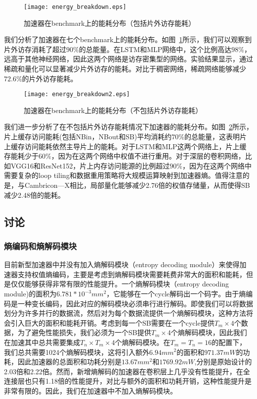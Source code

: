 \begin{figure}[h]
\centering
\texttt{[image: energy\_breakdown.eps]}
\caption{加速器在benchmark上的能耗分布（包括片外访存能耗）}
\label{fig:energy_breakdown}
\end{figure}

我们分析了加速器在七个benchmark上的能耗分布。如图~\ref{fig:energy_breakdown}所示，我们可以观察到片外访存消耗了超过$90\%$的总能量。在LSTM和MLP网络中，这个比例高达$98\%$，远高于其他神经网络，因此这两个网络是访存密集型的网络。实验结果显示，通过稀疏和量化可以显著减少片外访存的能耗。对比于稠密网络，稀疏网络能够减少$72.6\%$的片外访存能耗。

\begin{figure}[h]
\centering
\texttt{[image: energy\_breakdown2.eps]}
\caption{加速器在benchmark上的能耗分布（不包括片外访存能耗）}
\label{fig:energy_breakdown2}
\end{figure}

我们进一步分析了在不包括片外访存能耗情况下加速器的能耗分布。如图~\ref{fig:energy_breakdown2}所示，片上缓存访问能耗(包括NBin，NBout和SB)平均消耗约$70\%$的总能量，这表明片上缓存访问能耗依然主导片上的能耗。对于LSTM和MLP这两个网络上，片上缓存能耗少于$60\%$，因为在这两个网络中权值不进行重用。对于深层的卷积网络，比如VGG16和ResNet152，片上内存访问能源的比例超过$90\%$，因为在这两个网络中需要复杂的loop tiling和数据重用策略将大规模运算映射到加速器熵。值得注意的是，与Cambricon—X相比，局部量化能够减少2.76倍的权值存储量，从而使得SB减少2.48倍的能耗。

\subsection{讨论}

\subsubsection{熵编码和熵解码模块}
\label{subsubsec:encoding_hw}

目前新型加速器中并没有加入熵解码模块（entropy decoding module）来使得加速器支持权值熵编码，主要是考虑到熵解码模块需要耗费非常大的面积和能耗，但是仅仅能够获得非常有限的性能提升。一个熵解码模块（entropy decoding module)的面积为$6.781*10^{-3}mm^2$，它能够在一个cycle解码出一个码字。由于熵编码是一种变长编码，因此对应的解码模块必须串行进行解码。即使我们可以将数据划分为许多并行的数据流，然后对为每个数据流提供一个熵解码模块，这种方法将会引入巨大的面积和能耗开销。考虑到每一个SB需要在一个cycle提供$T_m\times 4$个数据，为了避免性能损失，我们必须为一个SB提供$T_m\times 4$个熵解码模块，因此我们在加速其中总共需要集成$T_n\times T_m\times 4$个熵解码模块。在$T_m = T_n = 16$的配置下，我们总共需要1024个熵解码模块，这将引入额外$6.94mm^2$的面积和$971.37mW$的功耗，因此加速器的总面积和功耗分别是$13.67mm^2$和$1769.92mW$,分别是原始设计的2.03倍和2.22倍。然而，新增熵解码的加速器在卷积层上几乎没有性能提升，在全连接层也只有1.18倍的性能提升，对比与额外的面积和功耗开销，这种性能提升是非常有限的。因此，我们在加速器中不加入熵解码模块。

